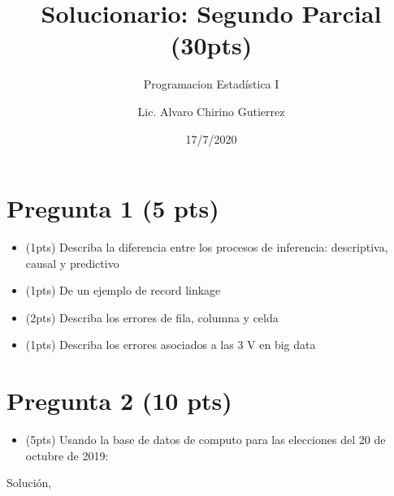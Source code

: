 \documentclass[
]{article}
\title{Solucionario: Segundo Parcial (30pts)}
\subtitle{Programacion Estadística I}
\author{Lic. Alvaro Chirino Gutierrez}
\date{17/7/2020}
\newenvironment{Shaded}{\begin{snugshade}}{\end{snugshade}}
\newcommand{\CharTok}[1]{\textcolor[rgb]{0.31,0.60,0.02}{#1}}
\newcommand{\CommentTok}[1]{\textcolor[rgb]{0.56,0.35,0.01}{\textit{#1}}}
\newcommand{\DataTypeTok}[1]{\textcolor[rgb]{0.13,0.29,0.53}{#1}}
\newcommand{\KeywordTok}[1]{\textcolor[rgb]{0.13,0.29,0.53}{\textbf{#1}}}
\newcommand{\NormalTok}[1]{#1}
\newcommand{\StringTok}[1]{\textcolor[rgb]{0.31,0.60,0.02}{#1}}
\providecommand{\tightlist}{%
  \setlength{\itemsep}{0pt}\setlength{\parskip}{0pt}}
\begin{document}
\maketitle

\hypertarget{pregunta-1-5-pts}{%
\section{Pregunta 1 (5 pts)}\label{pregunta-1-5-pts}}

\begin{itemize}
\tightlist
\item
  (1pts) Describa la diferencia entre los procesos de inferencia:
  descriptiva, causal y predictivo
\item
  (1pts) De un ejemplo de record linkage
\item
  (2pts) Describa los errores de fila, columna y celda
\item
  (1pts) Describa los errores asociados a las 3 V en big data
\end{itemize}

\hypertarget{pregunta-2-10-pts}{%
\section{Pregunta 2 (10 pts)}\label{pregunta-2-10-pts}}

\begin{itemize}
\tightlist
\item
  (5pts) Usando la base de datos de computo para las elecciones del 20
  de octubre de 2019:
\end{itemize}

Solución,

\begin{Shaded}
\end{Shaded}
\end{document}

